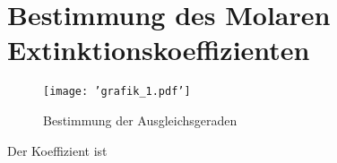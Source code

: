 \documentclass{article}
\begin{document}
\section*{Bestimmung des Molaren Extinktionskoeffizienten}


\begin{figure}
  \texttt{[image: 'grafik\_1.pdf']}
  \caption{Bestimmung der Ausgleichsgeraden}
\end{figure}

Der Koeffizient ist 
\end{document}
